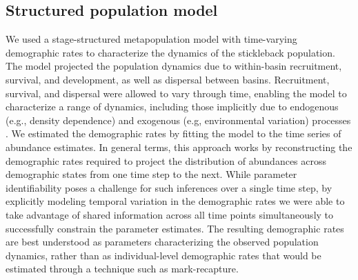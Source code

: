 \subsection*{Structured population model} 

We used a stage-structured metapopulation model \citep{caswell2001matrix}
with time-varying demographic rates
to characterize the dynamics of the stickleback population. 
The model projected the population dynamics due to 
within-basin recruitment, survival, and development, 
as well as dispersal between basins. 
Recruitment, survival, and dispersal were allowed to vary through time,
enabling the model to characterize a range of dynamics, 
including those implicitly due to endogenous (e.g., density dependence) 
and exogenous (e.g, environmental variation) processes
\citep{zeng1998, ives2012}. 
We estimated the demographic rates by  
fitting the model to the time series of abundance estimates. 
In general terms, this approach works by reconstructing the demographic rates required
to project the distribution of abundances across demographic states 
from one time step to the next. 
While parameter identifiability poses a challenge for such inferences over a single time
step, by explicitly modeling temporal variation in the demographic rates we were able 
to take advantage of shared information across all time points simultaneously to 
successfully constrain the parameter estimates.
The resulting demographic rates are best understood as parameters 
characterizing the observed population dynamics, 
rather than as individual-level demographic rates that would be estimated through a 
technique such as mark-recapture. 

